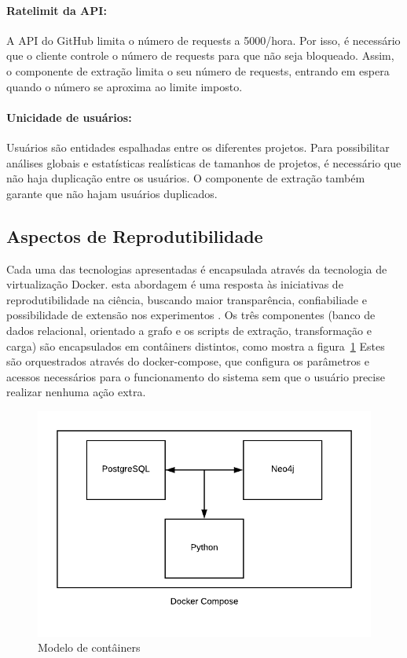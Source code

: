 \documentclass[sigconf]{acmart}
\begin{document}
\paragraph{Ratelimit da API: } A API do GitHub limita o número de requests a 5000/hora. Por isso, é necessário que o cliente controle o número de requests para que não seja bloqueado. Assim, o componente de extração limita o seu número de requests, entrando em espera quando o número se aproxima ao limite imposto.

\paragraph{Unicidade de usuários: } Usuários são entidades espalhadas entre os diferentes projetos. Para possibilitar análises globais e estatísticas realísticas de tamanhos de projetos, é necessário que não haja duplicação entre os usuários. O componente de extração também garante que não hajam usuários duplicados.



\subsection{Aspectos de Reprodutibilidade}

Cada uma das tecnologias apresentadas é encapsulada através da tecnologia de virtualização Docker. esta abordagem é uma resposta às iniciativas de reprodutibilidade na ciência, buscando maior transparência, confiabiliade e possibilidade de extensão nos experimentos \cite{freire2012}. Os três componentes (banco de dados relacional, orientado a grafo e os scripts de extração, transformação e carga) são encapsulados em contâiners distintos, como mostra a figura~\ref{fig:docker-model} Estes são orquestrados através do docker-compose, que configura os parâmetros e acessos necessários para o funcionamento do sistema sem que o usuário precise realizar nenhuma ação extra.

\begin{figure}[!htbp]
 \includegraphics[width=\columnwidth]{docker-model}
 \caption{Modelo de contâiners}\label{fig:docker-model}
\end{figure}
\end{document}

